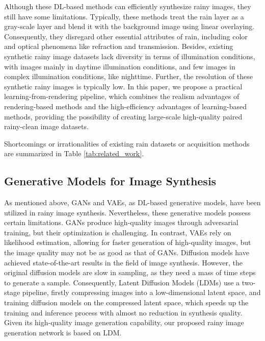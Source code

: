 Although these DL-based methods can efficiently synthesize rainy images, they still have some limitations. Typically, these methods treat the rain layer as a gray-scale layer and blend it with the background image using linear overlaying. Consequently, they disregard other essential attributes of rain, including color and optical phenomena like refraction and transmission. Besides, existing synthetic rainy image datasets lack diversity in terms of illumination conditions, with images mainly in daytime illumination conditions, and few images in complex illumination conditions, like nighttime. Further, the resolution of these synthetic rainy images is typically low. In this paper, we propose a practical learning-from-rendering pipeline, which combines the realism advantages of rendering-based methods and the high-efficiency advantages of learning-based methods, providing the possibility of creating large-scale high-quality paired rainy-clean image datasets.

Shortcomings or irrationalities of existing rain datasets or acquisition methods are summarized in Table \ref{tab:related_work}.

\subsection{Generative Models for Image Synthesis}

As mentioned above, GANs and VAEs, as DL-based generative models, have been utilized in rainy image synthesis. Nevertheless, these generative models possess certain limitations. GANs \cite{goodfellow2020generative} produce high-quality images through adversarial training, but their optimization is challenging. In contrast, VAEs \cite{kingma2013auto} rely on likelihood estimation, allowing for faster generation of high-quality images, but the image quality may not be as good as that of GANs. Diffusion models \cite{ho2020denoising,rombach2022high,peebles2023scalable} have achieved state-of-the-art results in the field of image synthesis. However, the original diffusion models \cite{ho2020denoising} are slow in sampling, as they need a mass of time steps to generate a sample. Consequently, Latent Diffusion Models (LDMs) \cite{rombach2022high} use a two-stage pipeline, firstly compressing images into a low-dimensional latent space, and  training diffusion models on the compressed latent space, which speeds up the training and inference process with almost no reduction in synthesis quality. Given its high-quality image generation capability, our proposed rainy image generation network is based on LDM.

